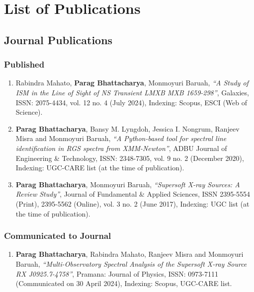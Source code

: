 \chapter{List of Publications} \label{appendix:publications}

    \section{Journal Publications}
    	\subsection{Published}
    		\begin{enumerate}
    			\item Rabindra Mahato, \textbf{Parag Bhattacharya}, Monmoyuri Baruah, \textit{``A Study of ISM in the Line of Sight of NS Transient LMXB MXB 1659-298''}, Galaxies, ISSN: 2075-4434, vol. 12 no. 4 (July 2024), Indexing: Scopus, ESCI (Web of Science).
    			
    			\item \textbf{Parag Bhattacharya}, Bansy M. Lyngdoh, Jessica I. Nongrum, Ranjeev Misra and Monmoyuri Baruah, \textit{``A Python-based tool for spectral line identification in RGS spectra from XMM-Newton''}, ADBU Journal of Engineering \& Technology, ISSN: 2348-7305, vol. 9 no. 2 (December 2020), Indexing: UGC-CARE list (at the time of publication).

    			\item \textbf{Parag Bhattacharya}, Monmoyuri Baruah, \textit{``Supersoft X-ray Sources: A Review Study''}, Journal of Fundamental \& Applied Sciences, ISSN 2395-5554 (Print), 2395-5562 (Online), vol. 3 no. 2 (June 2017), Indexing: UGC list (at the time of publication).
    		\end{enumerate}
    	
    		
    	\subsection{Communicated to Journal}
    		\begin{enumerate}
    			\item \textbf{Parag Bhattacharya}, Rabindra Mahato, Ranjeev Misra and Monmoyuri Baruah, \textit{``Multi-Observatory Spectral Analysis of the Supersoft X-ray Source RX J0925.7-4758''}, Pramana: Journal of Physics, ISSN: 0973-7111 (Communicated on 30 April 2024), Indexing: Scopus, UGC-CARE list.
    		\end{enumerate}
    
